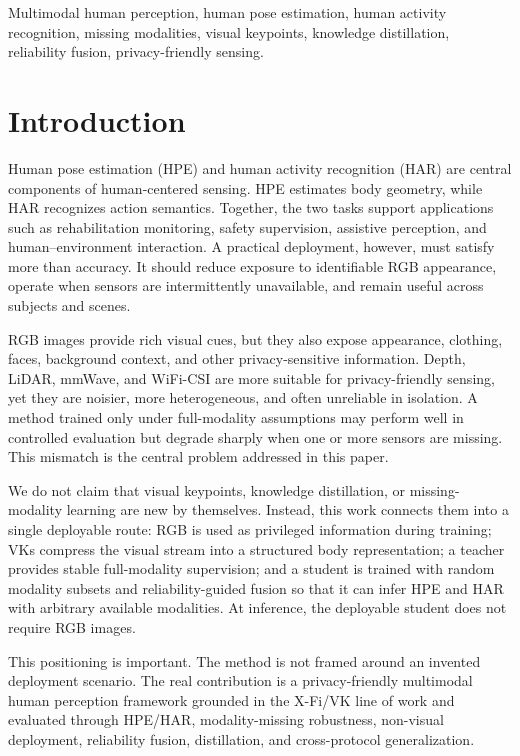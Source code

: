\documentclass[journal]{IEEEtran}
\begin{document}
\begin{IEEEkeywords}
Multimodal human perception, human pose estimation, human activity recognition, missing modalities, visual keypoints, knowledge distillation, reliability fusion, privacy-friendly sensing.
\end{IEEEkeywords}

\section{Introduction}

Human pose estimation (HPE) and human activity recognition (HAR) are central components of human-centered sensing. HPE estimates body geometry, while HAR recognizes action semantics. Together, the two tasks support applications such as rehabilitation monitoring, safety supervision, assistive perception, and human--environment interaction. A practical deployment, however, must satisfy more than accuracy. It should reduce exposure to identifiable RGB appearance, operate when sensors are intermittently unavailable, and remain useful across subjects and scenes.

RGB images provide rich visual cues, but they also expose appearance, clothing, faces, background context, and other privacy-sensitive information. Depth, LiDAR, mmWave, and WiFi-CSI are more suitable for privacy-friendly sensing, yet they are noisier, more heterogeneous, and often unreliable in isolation. A method trained only under full-modality assumptions may perform well in controlled evaluation but degrade sharply when one or more sensors are missing. This mismatch is the central problem addressed in this paper.

We do not claim that visual keypoints, knowledge distillation, or missing-modality learning are new by themselves. Instead, this work connects them into a single deployable route: RGB is used as privileged information during training; VKs compress the visual stream into a structured body representation; a teacher provides stable full-modality supervision; and a student is trained with random modality subsets and reliability-guided fusion so that it can infer HPE and HAR with arbitrary available modalities. At inference, the deployable student does not require RGB images.

This positioning is important. The method is not framed around an invented deployment scenario. The real contribution is a privacy-friendly multimodal human perception framework grounded in the X-Fi/VK line of work and evaluated through HPE/HAR, modality-missing robustness, non-visual deployment, reliability fusion, distillation, and cross-protocol generalization.
\end{document}
